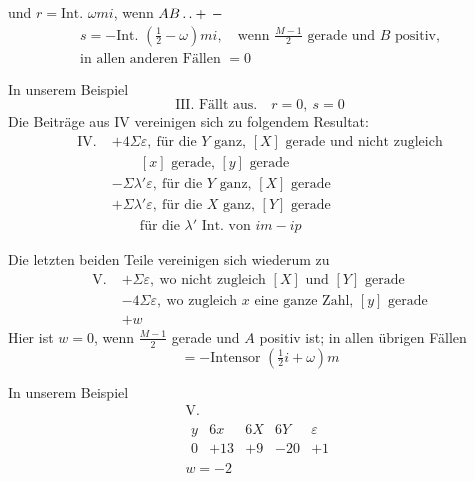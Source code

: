 und $r=\text{Int. }\omega mi$, wenn $AB\mathinner{.\,.}+\,-$
\[
\begin{gathered}
s=-\text{Int. }(\tfrac12-\omega)mi,\quad\text{wenn }\frac{M-1}{2}\text{ gerade und }B\text{ positiv,}\\
\text{in allen anderen Fällen }=0
\end{gathered}
\]

In unserem Beispiel
\[
\text{III. Fällt aus.}\quad r=0,\ s=0
\]
Die Beiträge aus IV vereinigen sich zu folgendem Resultat:
\[
\begin{aligned}
\mathrm{IV.}\;&+4\Sigma\varepsilon,\ \text{für die }Y\text{ ganz, }[X]\text{ gerade und nicht zugleich}\\
&\qquad[x]\text{ gerade, }[y]\text{ gerade}\\
&-\Sigma\lambda'\varepsilon,\ \text{für die }Y\text{ ganz, }[X]\text{ gerade}\\
&+\Sigma\lambda'\varepsilon,\ \text{für die }X\text{ ganz, }[Y]\text{ gerade}\\
&\qquad\text{für die }\lambda'\text{ Int. von }im-ip
\end{aligned}
\]

Die letzten beiden Teile vereinigen sich wiederum zu
\[
\begin{aligned}
\mathrm{V.}\;&+\Sigma\varepsilon,\ \text{wo nicht zugleich }[X]\text{ und }[Y]\text{ gerade}\\
&-4\Sigma\varepsilon,\ \text{wo zugleich }x\text{ eine ganze Zahl, }[y]\text{ gerade}\\
&+w
\end{aligned}
\]
Hier ist $w=0$, wenn $\frac{M-1}{2}$ gerade und $A$ positiv ist; in allen übrigen Fällen
\[
=-\text{Intensor }(\tfrac12i+\omega)m
\]

In unserem Beispiel
\[
\begin{gathered}
\mathrm{V.}\\
\begin{array}{c|r|r|r|r}
y&6x&6X&6Y&\varepsilon\\
0&+13&+9&-20&+1
\end{array}\\
w=-2
\end{gathered}
\]


